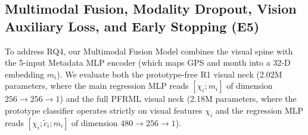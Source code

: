 \documentclass[conference]{IEEEtran}
\begin{document}
\subsection{
  Multimodal Fusion, Modality Dropout, Vision Auxiliary Loss, and Early Stopping
  (E5)
}
\label{subsec:fusion_methodology}

To address RQ4, our Multimodal Fusion Model combines the visual spine with the
5-input Metadata MLP encoder (which maps GPS and month into a 32-D embedding
$m_i$). We evaluate both the prototype-free R1 visual neck (2.02M parameters,
where the main regression MLP reads $[\chi_i; m_i]$ of dimension
$256 \to 256 \to 1$) and the full PFRML visual neck (2.18M parameters, where the
prototype classifier operates strictly on visual features $\chi_i$ and the
regression MLP reads $[\chi_i; \tilde{c}_i; m_i]$ of dimension
$480 \to 256 \to 1$).
\end{document}
